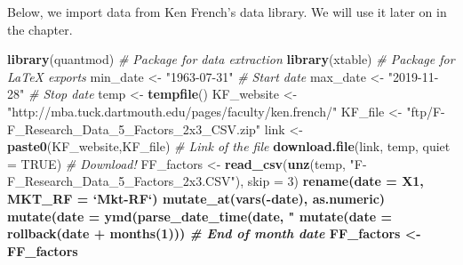 \documentclass[]{krantz}
\makeatletter
\newenvironment{Shaded}{\begin{snugshade}}{\end{snugshade}}
\newcommand{\CommentTok}[1]{\textcolor[rgb]{0.37,0.37,0.37}{\textit{#1}}}
\newcommand{\DataTypeTok}[1]{\textcolor[rgb]{0.27,0.27,0.27}{#1}}
\newcommand{\DecValTok}[1]{\textcolor[rgb]{0.06,0.06,0.06}{#1}}
\newcommand{\KeywordTok}[1]{\textcolor[rgb]{0.27,0.27,0.27}{\textbf{#1}}}
\newcommand{\NormalTok}[1]{#1}
\newcommand{\OperatorTok}[1]{\textcolor[rgb]{0.43,0.43,0.43}{\textbf{#1}}}
\newcommand{\OtherTok}[1]{\textcolor[rgb]{0.37,0.37,0.37}{#1}}
\newcommand{\StringTok}[1]{\textcolor[rgb]{0.5,0.5,0.5}{#1}}
\newenvironment{kframe}{%
\medskip{}
\setlength{\fboxsep}{.8em}
 \def\at@end@of@kframe{}%
 \ifinner\ifhmode%
  \def\at@end@of@kframe{\end{minipage}}%
  \begin{minipage}{\columnwidth}%
 \fi\fi%
 \def\FrameCommand##1{\hskip\@totalleftmargin \hskip-\fboxsep
 \colorbox{shadecolor}{##1}\hskip-\fboxsep
     \hskip-\linewidth \hskip-\@totalleftmargin \hskip\columnwidth}%
 \MakeFramed {\advance\hsize-\width
   \@totalleftmargin\z@ \linewidth\hsize
   \@setminipage}}%
 {\par\unskip\endMakeFramed%
 \at@end@of@kframe}
\renewenvironment{Shaded}{\begin{kframe}}{\end{kframe}}
\theoremstyle{definition}
\theoremstyle{definition}
\theoremstyle{definition}
\theoremstyle{remark}
\makeatother
\begin{document}
Below, we import data from Ken French's data library. We will use it
later on in the chapter.

\footnotesize

\begin{Shaded}
\begin{Highlighting}[]
\KeywordTok{library}\NormalTok{(quantmod)                         }\CommentTok{# Package for data extraction}
\KeywordTok{library}\NormalTok{(xtable)                           }\CommentTok{# Package for LaTeX exports }
\NormalTok{min_date <-}\StringTok{ "1963-07-31"}                  \CommentTok{# Start date}
\NormalTok{max_date <-}\StringTok{ "2019-11-28"}                  \CommentTok{# Stop date}
\NormalTok{temp <-}\StringTok{ }\KeywordTok{tempfile}\NormalTok{()}
\NormalTok{KF_website <-}\StringTok{ "http://mba.tuck.dartmouth.edu/pages/faculty/ken.french/"}
\NormalTok{KF_file <-}\StringTok{ "ftp/F-F_Research_Data_5_Factors_2x3_CSV.zip"}
\NormalTok{link <-}\StringTok{ }\KeywordTok{paste0}\NormalTok{(KF_website,KF_file)        }\CommentTok{# Link of the file}
\KeywordTok{download.file}\NormalTok{(link, temp, }\DataTypeTok{quiet =} \OtherTok{TRUE}\NormalTok{)   }\CommentTok{# Download!}
\NormalTok{FF_factors <-}\StringTok{ }\KeywordTok{read_csv}\NormalTok{(}\KeywordTok{unz}\NormalTok{(temp, }\StringTok{"F-F_Research_Data_5_Factors_2x3.CSV"}\NormalTok{), }
                       \DataTypeTok{skip =} \DecValTok{3}\NormalTok{) }\OperatorTok{%
\StringTok{    }\KeywordTok{rename}\NormalTok{(}\DataTypeTok{date =}\NormalTok{ X1, }\DataTypeTok{MKT_RF =} \StringTok{`}\DataTypeTok{Mkt-RF}\StringTok{`}\NormalTok{) }\OperatorTok{%
\StringTok{    }\KeywordTok{mutate_at}\NormalTok{(}\KeywordTok{vars}\NormalTok{(}\OperatorTok{-}\NormalTok{date), as.numeric) }\OperatorTok{%
\StringTok{    }\KeywordTok{mutate}\NormalTok{(}\DataTypeTok{date =} \KeywordTok{ymd}\NormalTok{(}\KeywordTok{parse_date_time}\NormalTok{(date, }\StringTok{"%
\StringTok{    }\KeywordTok{mutate}\NormalTok{(}\DataTypeTok{date =} \KeywordTok{rollback}\NormalTok{(date }\OperatorTok{+}\StringTok{ }\KeywordTok{months}\NormalTok{(}\DecValTok{1}\NormalTok{)))              }\CommentTok{# End of month date}
\NormalTok{FF_factors <-}\StringTok{ }\NormalTok{FF_factors }\OperatorTok{%
}}}}}
\end{Highlighting}
\end{Shaded}
\end{document}
